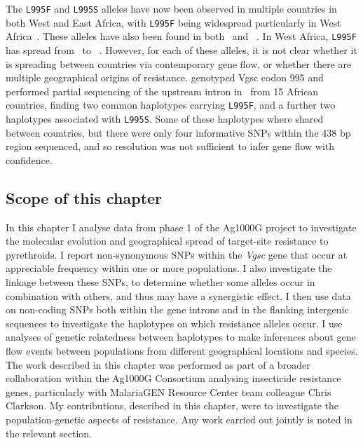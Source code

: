 \begin{refsection}
The \texttt{L995F} and \texttt{L995S} alleles have now been observed in multiple countries in both West and East Africa, with \texttt{L995F} being widespread particularly in West Africa~\parencite{WHO2018GRIR}.
%
These alleles have also been found in both \agam\ and \acol~\parencite{Clarkson2014,Norris2015,Djouaka2018}.
%
In West Africa, \texttt{L995F} has spread from \agam\ to \acol~\parencite{Clarkson2014,Norris2015}.
%
However, for each of these alleles, it is not clear whether it is spreading between countries via contemporary gene flow, or whether there are multiple geographical origins of resistance.
%
\textcite{Pinto2007} genotyped Vgsc codon 995 and performed partial sequencing of the upstream intron in \agam\ from 15 African countries, finding two common haplotypes carrying \texttt{L995F}, and a further two haplotypes associated with \texttt{L995S}.
%
Some of these haplotypes where shared between countries, but there were only four informative SNPs within the 438 bp region sequenced, and so resolution was not sufficient to infer gene flow with confidence.


\subsection{Scope of this chapter}\label{subsec:intro-scope}


In this chapter I analyse data from phase 1 of the Ag1000G project to investigate the molecular evolution and geographical spread of target-site resistance to pyrethroids.
%
I report non-synonymous SNPs within the \textit{Vgsc} gene that occur at appreciable frequency within one or more populations.
%
I also investigate the linkage between these SNPs, to determine whether some alleles occur in combination with others, and thus may have a synergistic effect.
%
I then use data on non-coding SNPs both within the gene introns and in the flanking intergenic sequences to investigate the haplotypes on which resistance alleles occur.
%
I use analyses of genetic relatedness between haplotypes to make inferences about gene flow events between populations from different geographical locations and species.
%
The work described in this chapter was performed as part of a broader collaboration within the Ag1000G Consortium analysing insecticide resistance genes, particularly with MalariaGEN Resource Center team colleague Chris Clarkson.
%
My contributions, described in this chapter, were to investigate the population-genetic aspects of resistance.
%
Any work carried out jointly is noted in the relevant section.



\end{refsection}
